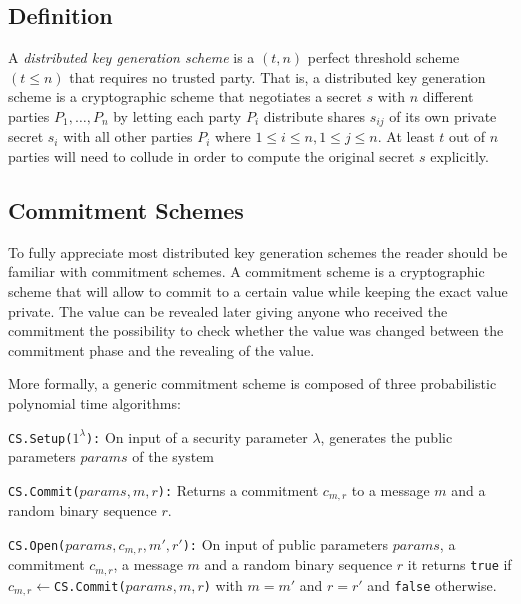 \subsection{Definition}
\begin{defn}
\label{def:dkg_scheme}
 A \textit{distributed key generation scheme} is a $\left( t,n \right)$ perfect threshold scheme $\left( t \leq n \right)$ that requires no trusted party. That is, a distributed key generation scheme is a cryptographic scheme that negotiates a secret $s$ with $n$ different parties $P_1, \ldots, P_n$ by letting each party $P_i$ distribute shares $s_{ij}$ of its own private secret $s_i$ with all other parties $P_i$ where $1 \leq i \leq n, 1 \leq j \leq n$. At least $t$ out of $n$ parties will need to collude in order to compute the original secret $s$ explicitly.
\end{defn}

\subsection{Commitment Schemes}
To fully appreciate most distributed key generation schemes the reader should be familiar with commitment schemes. A commitment scheme is a cryptographic scheme that will allow to commit to a certain value while keeping the exact value private. The value can be revealed later giving anyone who received the commitment the possibility to check whether the value was changed between the commitment phase and the revealing of the value.

More formally, a generic commitment scheme is composed of three probabilistic polynomial time algorithms:

\begin{description}
 \item \texttt{CS.Setup($1^{\lambda}$):} On input of a security parameter $\lambda$, generates the public parameters $params$ of the system
 \item \texttt{CS.Commit($params, m, r$):} Returns a commitment $c_{m,r}$ to a message $m$ and a random binary sequence $r$.
 \item \texttt{CS.Open($params, c_{m,r}, m', r'$):} On input of public parameters $params$, a commitment $c_{m,r}$, a message $m$ and a random binary sequence $r$ it returns \texttt{true} if $c_{m,r} \leftarrow $\texttt{CS.Commit($params, m, r$)} with $m = m'$ and $r = r'$ and \texttt{false} otherwise.
\end{description}

